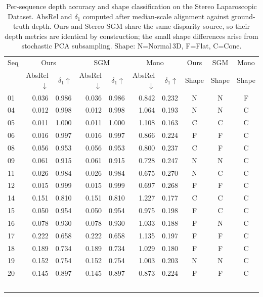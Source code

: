\documentclass[review]{elsarticle}
\begin{document}
\begin{table}[h]
\centering
\caption{Per-sequence depth accuracy and shape classification on the Stereo Laparoscopic Dataset. AbsRel and $\delta_1$ computed after median-scale alignment against ground-truth depth. Ours and Stereo SGM share the same disparity source, so their depth metrics are identical by construction; the small shape differences arise from stochastic PCA subsampling. Shape: N=Normal\,3D, F=Flat, C=Cone.}
\label{tab:supp_stereo_lap_per_seq}
\setlength{\tabcolsep}{3.5pt}
\renewcommand{\arraystretch}{1.05}
\footnotesize
\begin{tabular}{lrrrrrrccc}
\toprule
Seq & \multicolumn{2}{c}{Ours} & \multicolumn{2}{c}{SGM} & \multicolumn{2}{c}{Mono} & Ours & SGM & Mono \\
\cmidrule(lr){2-3}\cmidrule(lr){4-5}\cmidrule(lr){6-7}
 & AbsRel$\downarrow$ & $\delta_1$$\uparrow$ & AbsRel$\downarrow$ & $\delta_1$$\uparrow$ & AbsRel$\downarrow$ & $\delta_1$$\uparrow$ & Shape & Shape & Shape \\
\midrule
01 & 0.036 & 0.986 & 0.036 & 0.986 & 0.842 & 0.232 & N & N & F \\
04 & 0.012 & 0.998 & 0.012 & 0.998 & 1.064 & 0.193 & N & N & C \\
05 & 0.011 & 1.000 & 0.011 & 1.000 & 1.108 & 0.163 & C & C & C \\
06 & 0.016 & 0.997 & 0.016 & 0.997 & 0.866 & 0.224 & F & F & C \\
08 & 0.056 & 0.953 & 0.056 & 0.953 & 0.800 & 0.237 & C & F & C \\
09 & 0.061 & 0.915 & 0.061 & 0.915 & 0.728 & 0.247 & N & N & C \\
11 & 0.026 & 0.984 & 0.026 & 0.984 & 0.675 & 0.270 & N & C & C \\
12 & 0.015 & 0.999 & 0.015 & 0.999 & 0.697 & 0.268 & F & F & C \\
14 & 0.151 & 0.810 & 0.151 & 0.810 & 1.227 & 0.177 & C & C & C \\
15 & 0.050 & 0.954 & 0.050 & 0.954 & 0.975 & 0.198 & F & C & C \\
16 & 0.078 & 0.930 & 0.078 & 0.930 & 1.033 & 0.188 & F & N & C \\
17 & 0.222 & 0.658 & 0.222 & 0.658 & 1.135 & 0.197 & F & F & C \\
18 & 0.189 & 0.734 & 0.189 & 0.734 & 1.029 & 0.180 & F & F & C \\
19 & 0.152 & 0.754 & 0.152 & 0.754 & 1.003 & 0.203 & N & N & C \\
20 & 0.145 & 0.897 & 0.145 & 0.897 & 0.873 & 0.224 & F & F & C \\
$$
\end{tabular}
\end{table}
\end{document}
